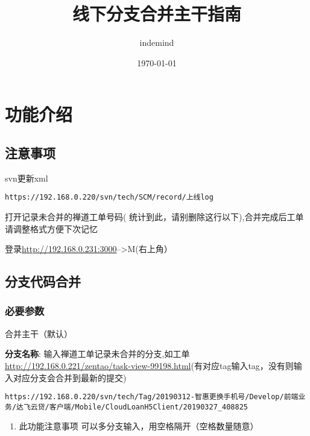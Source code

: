 \documentclass[11pt]{article}
\author{indemind}
\date{\today}
\title{线下分支合并主干指南}
\begin{document}
\maketitle
\tableofcontents

\section{功能介绍}
\label{sec-1}
\subsection{注意事项}
\label{sec-1-1}
svn更新xml
\begin{verbatim}
https://192.168.0.220/svn/tech/SCM/record/上线log
\end{verbatim}


打开记录未合并的禅道工单号码( 统计到此，请别删除这行以下),合并完成后工单请调整格式方便下次记忆

登录\url{http://192.168.0.231:3000}-->M(右上角）

\subsection{分支代码合并}
\label{sec-1-2}

\subsubsection{必要参数}
\label{sec-1-2-1}
合并主干（默认）

 \textbf{分支名称}:
输入禅道工单记录未合并的分支,如工单\url{http://192.168.0.221/zentao/task-view-99198.html}(有对应tag输入tag，没有则输入对应分支会合并到最新的提交)
\begin{verbatim}
https://192.168.0.220/svn/tech/Tag/20190312-智惠更换手机号/Develop/前端业务/达飞云贷/客户端/Mobile/CloudLoanH5Client/20190327_408825
\end{verbatim}

\begin{enumerate}
\item 此功能注意事项
\label{sec-1-2-1-1}
可以多分支输入，用空格隔开（空格数量随意）
\end{enumerate}
\end{document}
